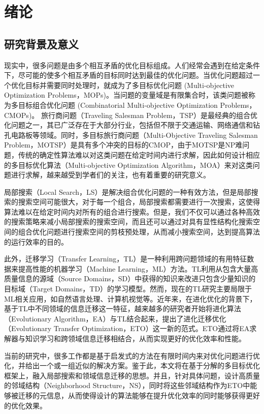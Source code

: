 \chapter{绪论}

\section{研究背景及意义}
现实中，很多问题是由多个相互矛盾的优化目标组成。人们经常会遇到在给定条件下，尽可能的使多个相互矛盾的目标同时达到最佳的优化问题。当优化问题超过一个优化目标并需要同时处理时，就成为了多目标优化问题 (Multi-objective Optimization Problems，MOPs)。当问题的变量域是有限集合时，该类问题被称为多目标组合优化问题 (Combinatorial Multi-objective Optimization Problems，CMOPs)。
旅行商问题（Traveling Salesman Problem，TSP）是最经典的组合优化问题之一，其已广泛存在于大部分行业，包括但不限于交通运输、网络通信和钻孔电路板等领域。同时，多目标旅行商问题（Multi-Objective Traveling Salesman Problem，MOTSP）是具有多个冲突的目标的CMOP，由于MOTSP是NP难问题，传统的确定性算法难以对这类问题在给定时间内进行求解，因此如何设计相应的多目标优化算法（Multi-objective Optimization Algorithm，MOA）来对这类问题进行求解，越来越受到学者们的关注，也有着重要的研究意义。
\par
局部搜索（Local Search，LS）是解决组合优化问题的一种有效方法，但是局部搜索的搜索空间可能很大，对于每一个组合，局部搜索都需要进行一次搜索，这使得算法难以在给定时间内对所有的组合进行搜索。但是，我们不仅可以通过各种高效的搜索策略来减小局部搜索的搜索空间，而且还可以通过对具有显性结构化搜索空间的组合优化问题进行搜索空间的剪枝预处理，从而减小搜索空间，达到提高算法的运行效率的目的。
\par
此外，迁移学习（Transfer Learning，TL）是一种利用跨问题领域的有用特征数据来提高性能的机器学习（Machine Learning，ML）方法。TL利用从包含大量高质量信息的源域（Source Domains，SD）中获得的知识来改进只包含少量知识的目标域（Target Domains，TD）的学习模型\cite{pan2009survey}。然而，现在的TL研究主要局限于ML相关应用，如自然语言处理、计算机视觉等。近年来，在进化优化的背景下，基于TL中不同领域的信息迁移这一特征，越来越多的研究者开始将进化算法（Evolutionary Algorithm，EA）与TL结合起来，提出了进化迁移优化（Evolutionary Transfer Optimization，ETO）这一新的范式。ETO通过将EA求解器与知识学习和跨领域信息迁移相结合，从而实现更好的优化效率和性能。
\par
当前的研究中，很多工作都是基于启发式的方法在有限时间内来对优化问题进行优化，并给出一个或一组近似的解决方案。鉴于此，本文将在基于分解的多目标优化框架上，融入局部搜索和领域信息迁移的思想。并且，针对具体问题，设计高质量的邻域结构（Neighborhood Structure，NS），同时将这些邻域结构作为ETO中能够被迁移的元信息，从而使得设计的算法能够在提升优化效率的同时能够获得更好的优化效果。

